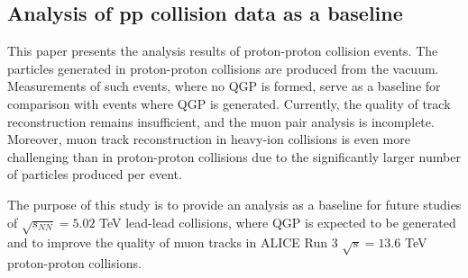     \subsection{Analysis of pp collision data as a baseline}
    This paper presents the analysis results of proton-proton collision events. The particles generated in proton-proton collisions are produced from the vacuum. Measurements of such events, where no QGP is formed, serve as a baseline for comparison with events where QGP is generated. Currently, the quality of track reconstruction remains insufficient, and the muon pair analysis is incomplete. Moreover, muon track reconstruction in heavy-ion collisions is even more challenging than in proton-proton collisions due to the significantly larger number of particles produced per event.  

    The purpose of this study is to provide an analysis as a baseline for future studies of $\sqrt{s_{NN}} = 5.02$ TeV lead-lead collisions, where QGP is expected to be generated and to improve the quality of muon tracks in ALICE Run 3 $\sqrt{s} = 13.6$ TeV proton-proton collisions.